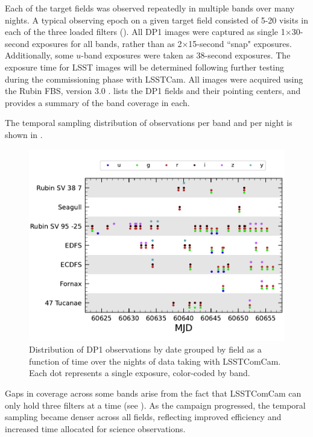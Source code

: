 
Each of the \nfields target fields was observed repeatedly in multiple bands over  many nights.
A typical observing \gls{epoch} on a given target field consisted of 5-20 visits in each of the three loaded filters ().
All DP1 images were captured as single 1$\times$30-second exposures for all bands, rather than as  2$\times$15-second ``snap" exposures.
Additionally, some $u$-band exposures were taken as 38-second exposures.
The  exposure time for LSST images will be determined following further testing during the commissioning phase with  LSSTCam.
All images were acquired using the Rubin \gls{FBS}, version 3.0 \citep{Naghib_2019, peter_yoachim_2024_13985198}.
 lists the \nfields \gls{DP1} fields and their pointing centers, and provides a summary of the band coverage in each.

The temporal sampling distribution of observations per band and per night is shown in .
\begin{figure}[htb!]
\includegraphics[width=\linewidth]{visitDates}
\caption{Distribution of DP1 observations by date grouped by field as a function of time over the \nnightscomcam nights of data taking with LSSTComCam.
Each dot represents a single  exposure, color-coded by band.}
\label{fig:target_fields_temporal_sampling}
\end{figure}
Gaps in coverage across some bands arise from the fact that \gls{LSSTComCam} can only hold three filters at a time (see ).
As the campaign progressed, the temporal sampling became denser across all fields, reflecting improved efficiency and increased time allocated for science observations.

